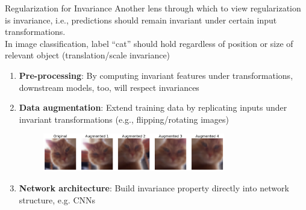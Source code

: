 \documentclass[11pt,compress,t,notes=noshow, xcolor=table]{beamer}
\begin{document}
\begin{vbframe}{Regularization for Invariance}
Another lens through which to view regularization is invariance, i.e., predictions should remain invariant under certain input transformations.\\
In image classification, label ``cat'' should hold regardless of position or size of relevant object (translation/scale invariance)
\begin{enumerate}\setlength\itemsep{1.02em}
    \item \textbf{Pre-processing}: By computing invariant features under transformations, downstream models, too, will respect invariances
    \item \textbf{Data augmentation}: Extend training data by replicating inputs under invariant transformations (e.g., flipping/rotating images)
    \begin{figure}
    \includegraphics[width=0.75\textwidth]{figure_man/data-augmentation-cat.png}\\
    \end{figure}
    \item \textbf{Network architecture}: Build invariance property directly into network structure, e.g. CNNs 
\end{enumerate}


\end{vbframe}

\endlecture
\end{document}
